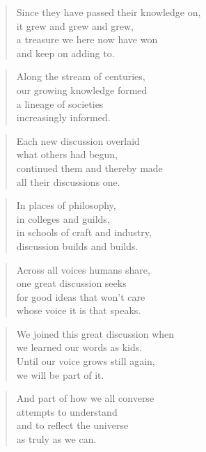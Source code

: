 \documentclass[14pt,a4paper]{article}
\begin{document}
\begin{verse}
Since they have passed their knowledge on,\\
it grew and grew and grew,\\
a treasure we here now have won\\
and keep on adding to.
\end{verse}

\begin{verse}
Along the stream of centuries,\\
our growing knowledge formed\\
a lineage of societies\\
increasingly informed.
\end{verse}

\begin{verse}
Each new discussion overlaid\\
what others had begun,\\
continued them and thereby made\\
all their discussions one.
\end{verse}

\begin{verse}
In places of philosophy,\\
in colleges and guilds,\\
in schools of craft and industry,\\
discussion builds and builds.
\end{verse}

\begin{verse}
Across all voices humans share,\\
one great discussion seeks\\
for good ideas that won’t care\\
whose voice it is that speaks.
\end{verse}

\begin{verse}
We joined this great discussion when\\
we learned our words as kids.\\
Until our voice grows still again,\\
we will be part of it.
\end{verse}

\begin{verse}
And part of how we all converse\\
attempts to understand\\
and to reflect the universe\\
as truly as we can.
\end{verse}
\end{document}
